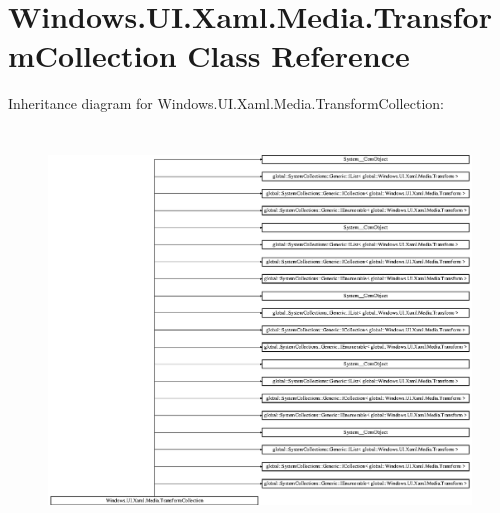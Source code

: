 \hypertarget{class_windows_1_1_u_i_1_1_xaml_1_1_media_1_1_transform_collection}{}\section{Windows.\+U\+I.\+Xaml.\+Media.\+Transform\+Collection Class Reference}
\label{class_windows_1_1_u_i_1_1_xaml_1_1_media_1_1_transform_collection}
Inheritance diagram for Windows.\+U\+I.\+Xaml.\+Media.\+Transform\+Collection\+:\begin{figure}[H]
\begin{center}
\leavevmode
\includegraphics[height=10.690908cm]{class_windows_1_1_u_i_1_1_xaml_1_1_media_1_1_transform_collection}
\end{center}
\end{figure}
